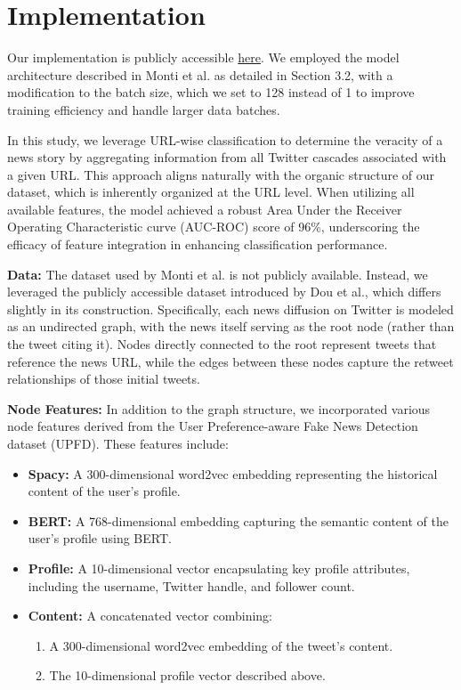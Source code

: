 \documentclass[sigconf,nonacm]{acmart}
\begin{document}
\section{Implementation}

Our implementation is publicly accessible \href{https://github.com/greglcr/GeometricDL}{here}. We employed the model architecture described in Monti et al.\cite{monti2019fakenewsdetectionsocial} as detailed in Section 3.2, with a modification to the batch size, which we set to 128 instead of 1 to improve training efficiency and handle larger data batches.

In this study, we leverage URL-wise classification to determine the veracity of a news story by aggregating information from all Twitter cascades associated with a given URL. This approach aligns naturally with the organic structure of our dataset, which is inherently organized at the URL level. When utilizing all available features, the model achieved a robust Area Under the Receiver Operating Characteristic curve (AUC-ROC) score of 96\%, underscoring the efficacy of feature integration in enhancing classification performance.

\textbf{Data:} The dataset used by Monti et al. \cite{monti2019fakenewsdetectionsocial} is not publicly available. Instead, we leveraged the publicly accessible dataset introduced by Dou et al.\cite{10.1145/3404835.3462990}, which differs slightly in its construction. Specifically, each news diffusion on Twitter is modeled as an undirected graph, with the news itself serving as the root node (rather than the tweet citing it). Nodes directly connected to the root represent tweets that reference the news URL, while the edges between these nodes capture the retweet relationships of those initial tweets.

\textbf{Node Features:} In addition to the graph structure, we incorporated various node features derived from the User Preference-aware Fake News Detection dataset (UPFD). These features include:
\begin{itemize}
    \item \textbf{Spacy:} A 300-dimensional word2vec embedding representing the historical content of the user's profile.
    \item \textbf{BERT:} A 768-dimensional embedding capturing the semantic content of the user’s profile using BERT.
    \item \textbf{Profile:} A 10-dimensional vector encapsulating key profile attributes, including the username, Twitter handle, and follower count.
    \item \textbf{Content:} A concatenated vector combining:
    \begin{enumerate}
        \item A 300-dimensional word2vec embedding of the tweet's content.
        \item The 10-dimensional profile vector described above.
    \end{enumerate}
\end{itemize}
\end{document}

